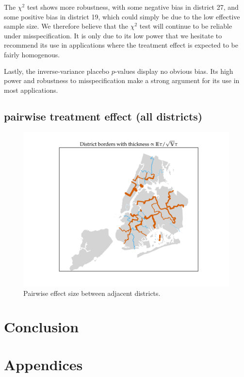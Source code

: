 \documentclass[letter]{article}
\makeatletter
\def\maxwidth{\ifdim\Gin@nat@width>\linewidth\linewidth
\else\Gin@nat@width\fi}
\let\Oldincludegraphics\includegraphics
\renewcommand{\includegraphics}[1]{\Oldincludegraphics[width=.8\maxwidth]{#1}}
\makeatother
\begin{document}
The \(\chi^2\) test shows more robustness, with some negative bias in district 27, and some positive bias in district 19, which could simply be due to the low effective sample size.
We therefore believe that the \(\chi^2\) test will continue to be reliable under misspecification.
It is only due to its low power that we hesitate to recommend its use in applications where the treatment effect is expected to be fairly homogenous.

Lastly, the inverse-variance placebo \(p\)-values display no obvious bias.
Its high power and robustness to misspecification make a strong argument
for its use in most applications.
    


    	\subsection{pairwise treatment effect (all districts)}\label{pairwise-treatment-effect-all-districts}

\begin{figure}
\centering
\includegraphics{NYC/NYC_plots/pairwise_multi.png}
\caption{Pairwise effect size between adjacent districts.}
\end{figure}
    


    	\section{Conclusion}\label{conclusion}
    


    	\section{Appendices}\label{appendices}
    
\end{document}
